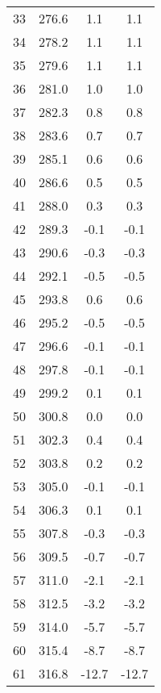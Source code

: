 \begin{tabular}{S[table-format=2.0]S[table-format=3.1]S[table-format=2.1]S[table-format=2.1]}
		33 & 276.6 & 1.1 & 1.1 \\
		34 & 278.2 & 1.1 & 1.1 \\
		35 & 279.6 & 1.1 & 1.1 \\
		36 & 281.0 & 1.0 & 1.0 \\
		37 & 282.3 & 0.8 & 0.8 \\
		38 & 283.6 & 0.7 & 0.7 \\
		39 & 285.1 & 0.6 & 0.6 \\
		40 & 286.6 & 0.5 & 0.5 \\
		41 & 288.0 & 0.3 & 0.3 \\
		42 & 289.3 & -0.1 & -0.1 \\
		43 & 290.6 & -0.3 & -0.3 \\
		44 & 292.1 & -0.5 & -0.5 \\
		45 & 293.8 & 0.6 & 0.6 \\
		46 & 295.2 & -0.5 & -0.5 \\
		47 & 296.6 & -0.1 & -0.1 \\
		48 & 297.8 & -0.1 & -0.1 \\
		49 & 299.2 & 0.1 & 0.1 \\
		50 & 300.8 & 0.0 & 0.0 \\
		51 & 302.3 & 0.4 & 0.4 \\
		52 & 303.8 & 0.2 & 0.2 \\
		53 & 305.0 & -0.1 & -0.1 \\
		54 & 306.3 & 0.1 & 0.1 \\
		55 & 307.8 & -0.3 & -0.3 \\
		56 & 309.5 & -0.7 & -0.7 \\
		57 & 311.0 & -2.1 & -2.1 \\
		58 & 312.5 & -3.2 & -3.2 \\
		59 & 314.0 & -5.7 & -5.7 \\
		60 & 315.4 & -8.7 & -8.7 \\
		61 & 316.8 & -12.7 & -12.7 \\
		\bottomrule
	\end{tabular}
